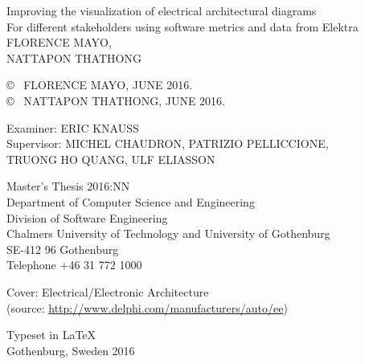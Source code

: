\vspace*{3.5cm}
Improving the visualization of electrical architectural diagrams\\
For different stakeholders using software metrics and data from Elektra\\[0.2cm]
FLORENCE MAYO, \\
NATTAPON THATHONG \setlength{\parskip}{1cm}

\copyright ~ FLORENCE MAYO, JUNE 2016. \\
\copyright ~ NATTAPON THATHONG, JUNE 2016.\setlength{\parskip}{1cm}

Examiner: ERIC KNAUSS \\
Supervisor: MICHEL CHAUDRON, PATRIZIO PELLICCIONE, \\ TRUONG HO QUANG, ULF ELIASSON
\setlength{\parskip}{1cm}

Master's Thesis 2016:NN\\	%
Department of Computer Science and Engineering\\
Division of Software Engineering\\
Chalmers University of Technology and University of Gothenburg\\
SE-412 96 Gothenburg\\
Telephone +46 31 772 1000 \setlength{\parskip}{0.5cm}

\vfill
Cover: Electrical/Electronic Architecture\\(source: \url{http://www.delphi.com/manufacturers/auto/ee}) \setlength{\parskip}{0.5cm}

Typeset in \LaTeX \\
Gothenburg, Sweden 2016

